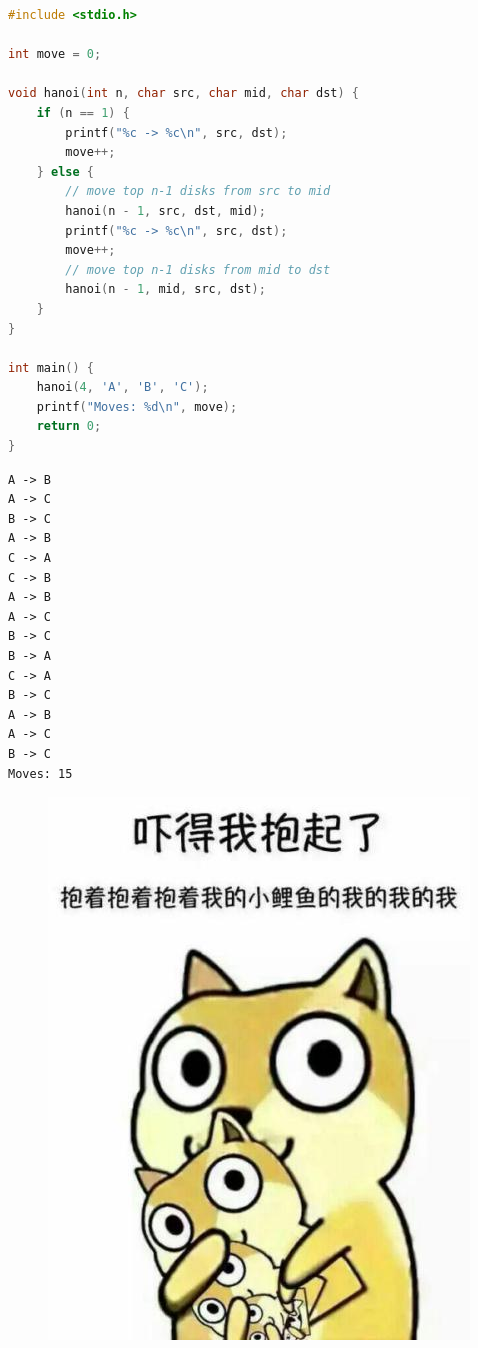 \begin{lstlisting}[language=C]
#include <stdio.h>

int move = 0;

void hanoi(int n, char src, char mid, char dst) {
	if (n == 1) {
		printf("%c -> %c\n", src, dst);
		move++;
	} else {
		// move top n-1 disks from src to mid
		hanoi(n - 1, src, dst, mid);
		printf("%c -> %c\n", src, dst);
		move++;
		// move top n-1 disks from mid to dst
		hanoi(n - 1, mid, src, dst);
	}
}

int main() {
	hanoi(4, 'A', 'B', 'C');
	printf("Moves: %d\n", move);
	return 0;
}
\end{lstlisting}

\begin{tcolorbox}
	\begin{verbatim}
A -> B
A -> C
B -> C
A -> B
C -> A
C -> B
A -> B
A -> C
B -> C
B -> A
C -> A
B -> C
A -> B
A -> C
B -> C
Moves: 15
	\end{verbatim}
\end{tcolorbox}

\begin{figure}[H]
	\centering
	\includegraphics[]{img/Chapter5/5-3/2.png}
\end{figure}

\newpage